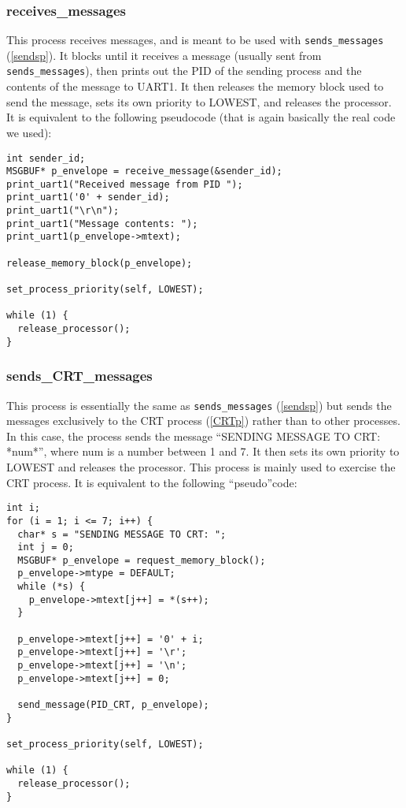 \documentclass[12pt]{article}
\begin{document}
\subsubsection{receives\_messages}\label{receivesp}
This process receives messages, and is meant to be used with \verb|sends_messages| (\ref{sendsp}). It blocks until it receives a message (usually sent from \verb|sends_messages|), then prints out the PID of the sending process and the contents of the message to UART1. It then releases the memory block used to send the message, sets its own priority to LOWEST, and releases the processor. It is equivalent to the following pseudocode (that is again basically the real code we used):

\begin{lstlisting}
int sender_id;
MSGBUF* p_envelope = receive_message(&sender_id);
print_uart1("Received message from PID ");
print_uart1('0' + sender_id);
print_uart1("\r\n");
print_uart1("Message contents: ");
print_uart1(p_envelope->mtext);

release_memory_block(p_envelope);

set_process_priority(self, LOWEST);

while (1) {
  release_processor();
}
\end{lstlisting}

\subsubsection{sends\_CRT\_messages}\label{sendsCRTp}
This process is essentially the same as \verb|sends_messages| (\ref{sendsp}) but sends the messages exclusively to the CRT process (\ref{CRTp}) rather than to other processes. In this case, the process sends the message ``SENDING MESSAGE TO CRT: *num*'', where num is a number between 1 and 7. It then sets its own priority to LOWEST and releases the processor. This process is mainly used to exercise the CRT process. It is equivalent to the following ``pseudo''code:
\begin{lstlisting}
int i;
for (i = 1; i <= 7; i++) {
  char* s = "SENDING MESSAGE TO CRT: ";
  int j = 0;
  MSGBUF* p_envelope = request_memory_block();
  p_envelope->mtype = DEFAULT;
  while (*s) {
    p_envelope->mtext[j++] = *(s++);
  }

  p_envelope->mtext[j++] = '0' + i;
  p_envelope->mtext[j++] = '\r';
  p_envelope->mtext[j++] = '\n';
  p_envelope->mtext[j++] = 0;

  send_message(PID_CRT, p_envelope);
}

set_process_priority(self, LOWEST);

while (1) {
  release_processor();
}
\end{lstlisting}
\end{document}
